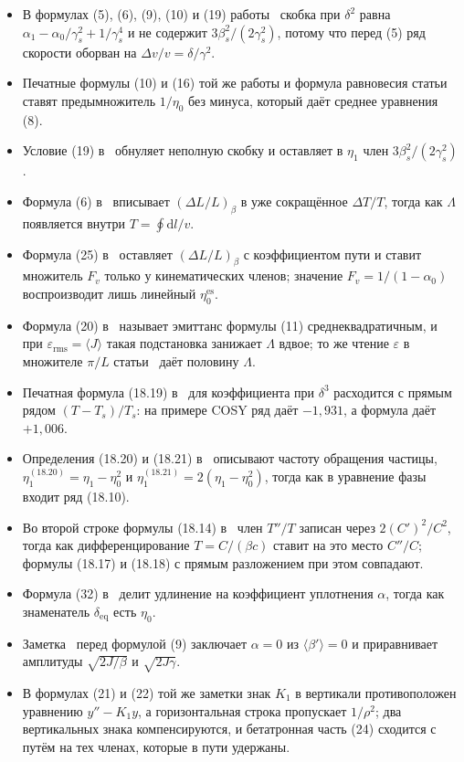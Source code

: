 \documentclass[aps,pra,preprint,a4paper,amsmath,amssymb,longbibliography]{revtex4-2}
\begin{document}
\begin{itemize}
\item В формулах (5), (6), (9), (10) и (19) работы~\cite{Senichev2013} скобка при $\delta^2$ равна $\alpha_1-\alpha_0/\gamma_s^2+1/\gamma_s^4$ и не содержит $3\beta_s^2/(2\gamma_s^2)$, потому что перед (5) ряд скорости оборван на $\Delta v/v=\delta/\gamma^2$.
\item Печатные формулы (10) и (16) той же работы и формула равновесия статьи~\cite{KolokolchikovMapping} ставят предымножитель $1/\eta_0$ без минуса, который даёт среднее уравнения (8).
\item Условие (19) в~\cite{Senichev2013} обнуляет неполную скобку и оставляет в $\eta_1$ член $3\beta_s^2/(2\gamma_s^2)$.
\item Формула (6) в~\cite{Senichev2013} вписывает $(\Delta L/L)_\beta$ в уже сокращённое $\Delta T/T$, тогда как $\Lambda$ появляется внутри $T=\oint\mathrm{d}l/v$.
\item Формула (25) в~\cite{Senichev2013} оставляет $(\Delta L/L)_\beta$ с коэффициентом пути и ставит множитель $F_v$ только у кинематических членов; значение $F_v=1/(1-\alpha_0)$ воспроизводит лишь линейный $\eta_0^{\mathrm{es}}$.
\item Формула (20) в~\cite{Senichev2013} называет эмиттанс формулы (11) среднеквадратичным, и при $\varepsilon_{\mathrm{rms}}=\langle J\rangle$ такая подстановка занижает $\Lambda$ вдвое; то же чтение $\varepsilon$ в множителе $\pi/L$ статьи~\cite{KolokolchikovMapping} даёт половину $\Lambda$.
\item Печатная формула (18.19) в~\cite{Ng2006} для коэффициента при $\delta^3$ расходится с прямым рядом $(T-T_s)/T_s$: на примере COSY ряд даёт $-1{,}931$, а формула даёт $+1{,}006$.
\item Определения (18.20) и (18.21) в~\cite{Ng2006} описывают частоту обращения частицы, $\eta_1^{(18.20)}=\eta_1-\eta_0^2$ и $\eta_1^{(18.21)}=2(\eta_1-\eta_0^2)$, тогда как в уравнение фазы входит ряд (18.10).
\item Во второй строке формулы (18.14) в~\cite{Ng2006} член $T''/T$ записан через $2(C')^2/C^2$, тогда как дифференцирование $T=C/(\beta c)$ ставит на это место $C''/C$; формулы (18.17) и (18.18) с прямым разложением при этом совпадают.
\item Формула (32) в~\cite{Shoji2005} делит удлинение на коэффициент уплотнения $\alpha$, тогда как знаменатель $\delta_{\mathrm{eq}}$ есть $\eta_0$.
\item Заметка~\cite{SenichevNote} перед формулой (9) заключает $\alpha=0$ из $\langle\beta'\rangle=0$ и приравнивает амплитуды $\sqrt{2J/\beta}$ и $\sqrt{2J\gamma}$.
\item В формулах (21) и (22) той же заметки знак $K_1$ в вертикали противоположен уравнению $y''-K_1 y$, а горизонтальная строка пропускает $1/\rho^2$; два вертикальных знака компенсируются, и бетатронная часть (24) сходится с путём на тех членах, которые в пути удержаны.
\end{itemize}
\end{document}
